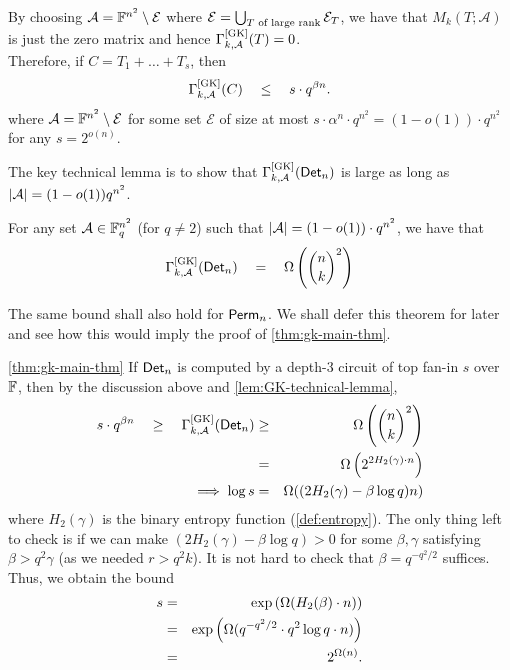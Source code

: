 By choosing $\mathcal{A} = \mathbb{F}^{n^2} \setminus \mathcal{E}$ where
 $\mathcal{E} = \bigcup_{\text{$T$ of large rank}} \mathcal{E}_T$, we
 have that $M_k(T;\mathcal{A})$ is just the zero matrix and hence
 $\Gamma^{\mathrm{[GK]}}_{k,\mathcal{A}}(T) = 0$.\\


Therefore, if $C = T_1 + \dots + T_s$, then 
\begin{equation}\label{eqn:gk-upper-bound-circuit}
\Gamma^{\mathrm{[GK]}}_{k,\mathcal{A}}(C) \quad \leq \quad s \cdot
q^{\beta n}.
\end{equation} 
where $\mathcal{A} = \mathbb{F}^{n^2} \setminus \mathcal{E}$ for some set
$\mathcal{E}$ of size at most $s \cdot \alpha^n \cdot q^{n^2} = (1 -
o(1)) \cdot q^{n^2}$ for any $s = 2^{o(n)}$.

The key technical lemma is to show that
$\Gamma^{\mathrm{[GK]}}_{k,\mathcal{A}}(\mathsf{Det}_n)$ is large as long as
$\left|\mathcal{A}\right| = (1 - o(1)) q^{n^2}$.

\begin{lemma}\label{lem:GK-technical-lemma}
  For any set $\mathcal{A} \in \mathbb{F}_q^{n^2}$ (for $q\neq 2$) such that
  $\left|\mathcal{A}\right| = (1 - o(1)) \cdot q^{n^2}$, we have that
\[
\Gamma^{\mathrm{[GK]}}_{k,\mathcal{A}}(\mathsf{Det}_n) \quad = \quad \Omega\left(\binom{n}{k}^2\right)
\]
\end{lemma}

The same bound shall also hold for $\mathsf{Perm}_n$. We shall defer this
theorem for later and see how this would imply the proof of
\autoref{thm:gk-main-thm}.

\begin{proofof}{\autoref{thm:gk-main-thm}}
  If $\mathsf{Det}_n$ is computed by a depth-3 circuit of top fan-in $s$ over
  $\mathbb{F}$, then by the discussion above and
  \autoref{lem:GK-technical-lemma},
\begin{eqnarray*}
s \cdot q^{\beta n} \quad \geq \quad \Gamma^{\mathrm{[GK]}}_{k,\mathcal{A}}(\mathsf{Det}_n) & \geq &    \Omega\left(\binom{n}{k}^2\right)\\
 & = & \Omega\left(2^{2H_2(\gamma)\cdot n}\right)\\
\implies \log s & = & \Omega((2H_2(\gamma) - \beta \log q)n)
\end{eqnarray*}
where $H_2(\gamma)$ is the binary entropy function
(\autoref{def:entropy}). The only thing left to check is if we can
make $(2H_2(\gamma) - \beta \log q) > 0$ for some $\beta,\gamma$
satisfying $\beta > q^2 \gamma$ (as we needed $r > q^2 k$). It is not
hard to check that $\beta = q^{-q^2/2}$ suffices. Thus, we obtain the
bound
\begin{eqnarray*}
  s &=&  \exp\left(\Omega(H_2(\beta)\cdot n)\right) \\
    &=&  \exp\left(\Omega(q^{-q^2/2} \cdot q^2 \log q \cdot n)\right)\\
  & =& 2^{\Omega(n)}.
\end{eqnarray*}
\end{proofof}


